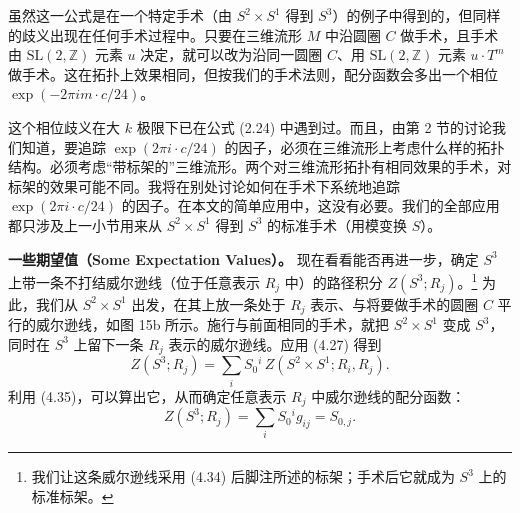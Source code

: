 \documentclass[11pt,a4paper]{article}
\begin{document}
虽然这一公式是在一个特定手术（由 $S^2\times S^1$ 得到 $S^3$）的例子中得到的，但同样的歧义出现在任何手术过程中。只要在三维流形 $M$ 中沿圆圈 $C$ 做手术，且手术由 $\mathrm{SL}(2,\mathbb{Z})$ 元素 $u$ 决定，就可以改为沿同一圆圈 $C$、用 $\mathrm{SL}(2,\mathbb{Z})$ 元素 $u\cdot T^m$ 做手术。这在拓扑上效果相同，但按我们的手术法则，配分函数会多出一个相位 $\exp(-2\pi im\cdot c/24)$。

这个相位歧义在大 $k$ 极限下已在公式 (2.24) 中遇到过。而且，由第 2 节的讨论我们知道，要追踪 $\exp(2\pi i\cdot c/24)$ 的因子，必须在三维流形上考虑什么样的拓扑结构。必须考虑“带标架的”三维流形。两个对三维流形拓扑有相同效果的手术，对标架的效果可能不同。我将在别处讨论如何在手术下系统地追踪 $\exp(2\pi i\cdot c/24)$ 的因子。在本文的简单应用中，这没有必要。我们的全部应用都只涉及上一小节用来从 $S^2\times S^1$ 得到 $S^3$ 的标准手术（用模变换 $S$）。

\textbf{一些期望值（Some Expectation Values）。} 现在看看能否再进一步，确定 $S^3$ 上带一条不打结威尔逊线（位于任意表示 $R_j$ 中）的路径积分 $Z(S^3;R_j)$。\footnote{我们让这条威尔逊线采用 (4.34) 后脚注所述的标架；手术后它就成为 $S^3$ 上的标准标架。} 为此，我们从 $S^2\times S^1$ 出发，在其上放一条处于 $R_j$ 表示、与将要做手术的圆圈 $C$ 平行的威尔逊线，如图 15b 所示。施行与前面相同的手术，就把 $S^2\times S^1$ 变成 $S^3$，同时在 $S^3$ 上留下一条 $R_j$ 表示的威尔逊线。应用 (4.27) 得到
\begin{equation}
    Z(S^3;R_j) = \sum_i S_0{}^i\, Z(S^2\times S^1;R_i,R_j). \tag{4.42}
\end{equation}
利用 (4.35)，可以算出它，从而确定任意表示 $R_j$ 中威尔逊线的配分函数：
\begin{equation}
    Z(S^3;R_j) = \sum_i S_0{}^i g_{ij} = S_{0,j}. \tag{4.43}
\end{equation}
\end{document}
